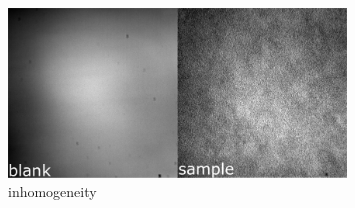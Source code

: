 \documentclass[11px]{article}
\begin{document}
\begin{figure}[h]
\begin{center}
\includegraphics[width=0.8\textwidth]{fig-s4_inhomogeneity.png}
\caption[]{inhomogeneity}
\end{center}
\label{fig:s4}
\end{figure}
\end{document}
